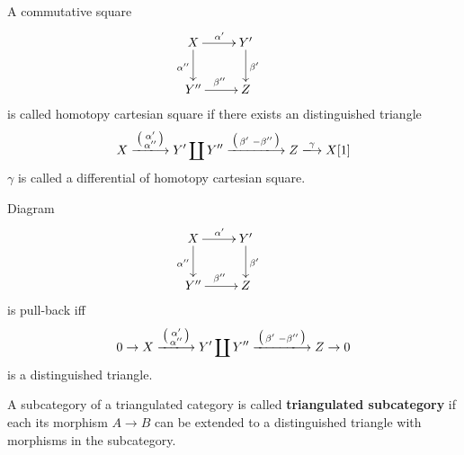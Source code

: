 \begin{mydefn}
A commutative square
\[
\xymatrix{
X \ar[r]^{\alpha'} \ar[d]_{\alpha''} &Y' \ar[d]^{\beta'}&\\
Y'' \ar[r]^{\beta''} & Z &
}
\]
is called homotopy cartesian square if there exists an distinguished triangle
\[
X \xlongrightarrow{\bigl(\begin{smallmatrix} \alpha'\\ 
\alpha'' 
\end{smallmatrix}\bigr)} Y' \coprod Y'' \xlongrightarrow{\bigl( \begin{smallmatrix} \beta' & -\beta'' \end{smallmatrix} \bigr) }  Z \xlongrightarrow{\gamma} X[1]
\]
$\gamma$ is called a differential of homotopy cartesian square.
\end{mydefn}

\begin{prop}
Diagram 
\[
\xymatrix{
X \ar[r]^{\alpha'} \ar[d]_{\alpha''} &Y' \ar[d]^{\beta'}&\\
Y'' \ar[r]^{\beta''} & Z &
}
\]
is pull-back iff 
\[
0 \rightarrow X \xlongrightarrow{\bigl(\begin{smallmatrix} \alpha'\\ 
\alpha'' 
\end{smallmatrix}\bigr)} Y' \coprod Y'' \xlongrightarrow{\bigl( \begin{smallmatrix} \beta' & -\beta'' \end{smallmatrix} \bigr)} Z \rightarrow 0
\]
is a distinguished triangle.
\end{prop}

\begin{mydefn}
A subcategory of a triangulated category is called \textbf{triangulated subcategory} if each its morphism $A \rightarrow B$ can be extended to a distinguished triangle with morphisms in the subcategory.
\end{mydefn}